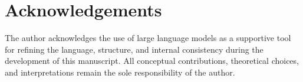 \documentclass[pdflatex,sn-mathphys-num]{sn-jnl} %
\theoremstyle{remark}
\theoremstyle{plain}
\begin{document}
  \section*{Acknowledgements}
    The author acknowledges the use of large language models as a supportive tool
    for refining the language, structure, and internal consistency during the development of this manuscript.
    All conceptual contributions, theoretical choices, and interpretations remain the sole responsibility of the author.

    
\end{document}
